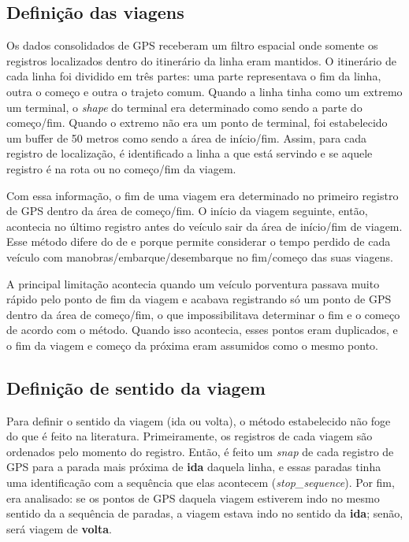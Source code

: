 \documentclass[        
    a4paper,          %
    12pt,             %
    chapter=TITLE,    %
    section=Title,    %
    subsection=Title, %
    oneside,          %
    english,          %
    spanish,          %
    brazil,           %
    fleqn             %
]{abntex2}
\begin{document}
  \hypertarget{definicao-das-viagens}{%
  \subsection{Definição das viagens}\label{definicao-das-viagens}}
  
  Os dados consolidados de GPS receberam um filtro espacial onde somente os registros localizados dentro do itinerário da linha eram mantidos. O itinerário de cada linha foi dividido em três partes: uma parte representava o fim da linha, outra o começo e outra o trajeto comum. Quando a linha tinha como um extremo um terminal, o \emph{shape} do terminal era determinado como sendo a parte do começo/fim. Quando o extremo não era um ponto de terminal, foi estabelecido um buffer de 50 metros como sendo a área de início/fim. Assim, para cada registro de localização, é identificado a linha a que está servindo e se aquele registro é na rota ou no começo/fim da viagem.
  
  Com essa informação, o fim de uma viagem era determinado no primeiro registro de GPS dentro da área de começo/fim. O início da viagem seguinte, então, acontecia no último registro antes do veículo sair da área de início/fim de viagem. Esse método difere do de \citet{Arbex2016} e \citet{Rabay2017} porque permite considerar o tempo perdido de cada veículo com manobras/embarque/desembarque no fim/começo das suas viagens.
  
  A principal limitação acontecia quando um veículo porventura passava muito rápido pelo ponto de fim da viagem e acabava registrando só um ponto de GPS dentro da área de começo/fim, o que impossibilitava determinar o fim e o começo de acordo com o método. Quando isso acontecia, esses pontos eram duplicados, e o fim da viagem e começo da próxima eram assumidos como o mesmo ponto.
  
  \hypertarget{definicao-de-sentido-da-viagem}{%
  \subsection{Definição de sentido da viagem}\label{definicao-de-sentido-da-viagem}}
  
  Para definir o sentido da viagem (ida ou volta), o método estabelecido não foge do que é feito na literatura. Primeiramente, os registros de cada viagem são ordenados pelo momento do registro. Então, é feito um \emph{snap} de cada registro de GPS para a parada mais próxima de \textbf{ida} daquela linha, e essas paradas tinha uma identificação com a sequência que elas acontecem (\emph{stop\_sequence}). Por fim, era analisado: se os pontos de GPS daquela viagem estiverem indo no mesmo sentido da a sequência de paradas, a viagem estava indo no sentido da \textbf{ida}; senão, será viagem de \textbf{volta}.
  
\end{document}
